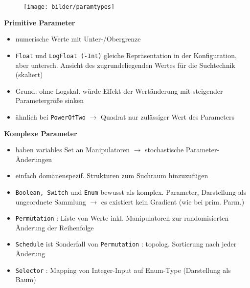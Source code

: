   \begin{frame}
    \begin{figure}[ht]
      \centering	      
      \texttt{[image: bilder/paramtypes]}
      \label{paramtypes}
    \end{figure}
    
  \textbf{Primitive Parameter}
  \begin{itemize}
    \item numerische Werte mit Unter-/Obergrenze
    \item \texttt{Float} und \texttt{LogFloat (-Int)} gleiche Repräsentation in der Konfiguration, aber 
    untersch. Ansicht des zugrundeliegenden Wertes für die Suchtechnik (skaliert)
    \item Grund: ohne Logskal. würde Effekt der Wertänderung mit steigender Parametergröße sinken
    \item ähnlich bei \texttt{PowerOfTwo} $\rightarrow$ Quadrat nur zulässiger Wert des Parameters
  \end{itemize}
  \end{frame}
  
  \begin{frame}
    \textbf{Komplexe Parameter}
    \begin{itemize}
      \item haben variables Set an Manipulatoren $\rightarrow$ stochastische Parameter-Änderungen
      \item einfach domänenspezif. Strukturen zum Suchraum hinzuzufügen
      \item \texttt{Boolean, Switch} und \texttt{Enum} bewusst als komplex. Parameter, Darstellung
      als ungeordnete Sammlung $\rightarrow$ es existiert kein Gradient (wie bei prim. Parm.)
      \item \texttt{Permutation} : Liste von Werte inkl. Manipulatoren zur randomisierten Änderung der Reihenfolge
      \item \texttt{Schedule} ist Sonderfall von \texttt{Permutation} : topolog. Sortierung nach jeder Änderung
      \item \texttt{Selector} : Mapping von Integer-Input auf Enum-Type (Darstellung als Baum)
    \end{itemize}
  \end{frame}
  
